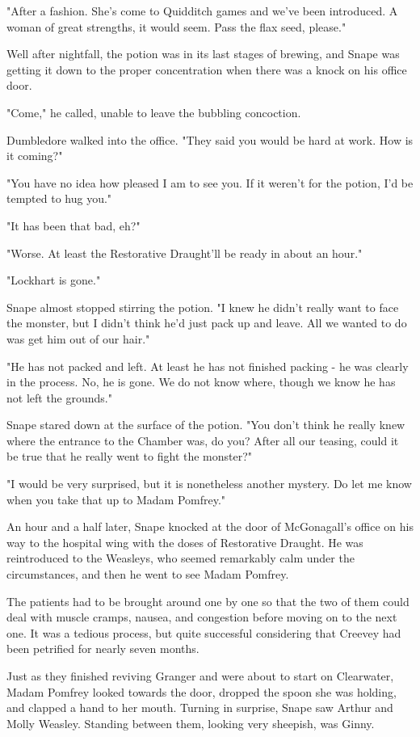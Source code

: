 "After a fashion. She's come to Quidditch games and we've been introduced. A woman of great strengths, it would seem. Pass the flax seed, please."

Well after nightfall, the potion was in its last stages of brewing, and Snape was getting it down to the proper concentration when there was a knock on his office door.

"Come," he called, unable to leave the bubbling concoction.

Dumbledore walked into the office. "They said you would be hard at work. How is it coming?"

"You have no idea how pleased I am to see you. If it weren't for the potion, I'd be tempted to hug you."

"It has been that bad, eh?"

"Worse. At least the Restorative Draught'll be ready in about an hour."

"Lockhart is gone."

Snape almost stopped stirring the potion. "I knew he didn't really want to face the monster, but I didn't think he'd just pack up and leave. All we wanted to do was get him out of our hair."

"He has not packed and left. At least he has not finished packing - he was clearly in the process. No, he is gone. We do not know where, though we know he has not left the grounds."

Snape stared down at the surface of the potion. "You don't think he really knew where the entrance to the Chamber was, do you? After all our teasing, could it be true that he really went to fight the monster?"

"I would be very surprised, but it is nonetheless another mystery. Do let me know when you take that up to Madam Pomfrey."

An hour and a half later, Snape knocked at the door of McGonagall's office on his way to the hospital wing with the doses of Restorative Draught. He was reintroduced to the Weasleys, who seemed remarkably calm under the circumstances, and then he went to see Madam Pomfrey.

The patients had to be brought around one by one so that the two of them could deal with muscle cramps, nausea, and congestion before moving on to the next one. It was a tedious process, but quite successful considering that Creevey had been petrified for nearly seven months.

Just as they finished reviving Granger and were about to start on Clearwater, Madam Pomfrey looked towards the door, dropped the spoon she was holding, and clapped a hand to her mouth. Turning in surprise, Snape saw Arthur and Molly Weasley. Standing between them, looking very sheepish, was Ginny.

